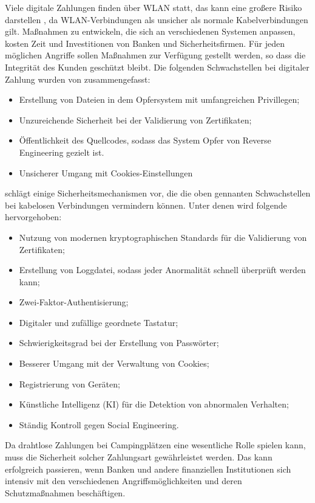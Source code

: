 Viele digitale Zahlungen finden über WLAN statt, das kann eine großere Risiko darstellen \cite{refip:NYRS}, 
da WLAN-Verbindungen als unsicher als normale Kabelverbindungen gilt. Maßnahmen zu entwickeln, die sich an 
verschiedenen Systemen anpassen, kosten Zeit und Investitionen von Banken und Sicherheitsfirmen. Für jeden 
möglichen Angriffe sollen Maßnahmen zur Verfügung gestellt werden, so dass die Integrität des Kunden
geschützt bleibt. Die folgenden Schwachstellen bei digitaler Zahlung wurden von \cite{refip:NYRS} 
zusammengefasst:

\begin{itemize}
    \item Erstellung von Dateien in dem Opfersystem mit umfangreichen Privillegen;
    \item Unzureichende Sicherheit bei der Validierung von Zertifikaten;
    \item Öffentlichkeit des Quellcodes, sodass das System Opfer von Reverse Engineering gezielt ist.
    \item Unsicherer Umgang mit Cookies-Einstellungen
\end{itemize}

\cite{refip:NYRS} schlägt einige Sicherheitsmechanismen vor, die die oben gennanten Schwachstellen bei 
kabelosen Verbindungen vermindern können. Unter denen wird folgende hervorgehoben: 

\begin{itemize}
    \item Nutzung von modernen kryptographischen Standards für die Validierung von Zertifikaten;
    \item Erstellung von Loggdatei, sodass jeder Anormalität schnell überprüft werden kann;
    \item Zwei-Faktor-Authentisierung;
    \item Digitaler und zufällige geordnete Tastatur;
    \item Schwierigkeitsgrad bei der Erstellung von Passwörter;
    \item Besserer Umgang mit der Verwaltung von Cookies;
    \item Registrierung von Geräten;
    \item Künstliche Intelligenz (KI) für die Detektion von abnormalen Verhalten;
    \item Ständig Kontroll gegen Social Engineering.
\end{itemize}

Da drahtlose Zahlungen bei Campingplätzen eine wesentliche Rolle spielen kann, muss die Sicherheit solcher
Zahlungsart gewährleistet werden. Das kann erfolgreich passieren, wenn Banken und andere finanziellen 
Institutionen sich intensiv mit den verschiedenen Angriffsmöglichkeiten und deren Schutzmaßnahmen beschäftigen.

